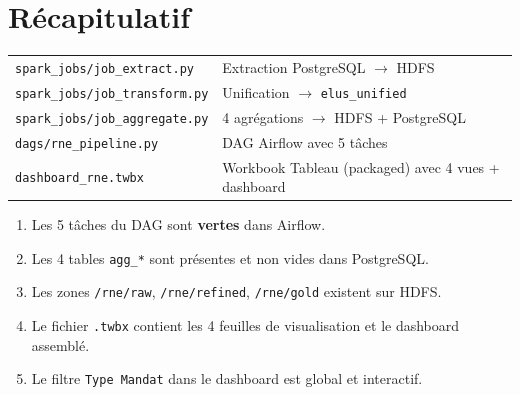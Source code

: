 \documentclass[11pt,a4paper]{article}
\begin{document}
\section*{Récapitulatif}

\begin{tcolorbox}[colback=bleu!5, colframe=bleu, fonttitle=\bfseries,
                  title=Fichiers à rendre]
\begin{tabular}{ll}
  \texttt{spark\_jobs/job\_extract.py}   & Extraction PostgreSQL $\to$ HDFS \\
  \texttt{spark\_jobs/job\_transform.py} & Unification $\to$ \texttt{elus\_unified} \\
  \texttt{spark\_jobs/job\_aggregate.py} & 4 agrégations $\to$ HDFS + PostgreSQL \\
  \texttt{dags/rne\_pipeline.py}         & DAG Airflow avec 5 tâches \\
  \texttt{dashboard\_rne.twbx}           & Workbook Tableau (packaged) avec 4 vues + dashboard \\
\end{tabular}
\end{tcolorbox}

\vspace{0.8em}
\begin{tcolorbox}[colback=vertTP!5, colframe=vertTP, fonttitle=\bfseries,
                  title=Critères de validation]
\begin{enumerate}
  \item Les 5 tâches du DAG sont \textcolor{vertTP}{\textbf{vertes}} dans Airflow.
  \item Les 4 tables \texttt{agg\_*} sont présentes et non vides dans PostgreSQL.
  \item Les zones \texttt{/rne/raw}, \texttt{/rne/refined}, \texttt{/rne/gold} existent sur HDFS.
  \item Le fichier \texttt{.twbx} contient les 4 feuilles de visualisation et le dashboard assemblé.
  \item Le filtre \texttt{Type Mandat} dans le dashboard est global et interactif.
\end{enumerate}
\end{tcolorbox}
\end{document}
